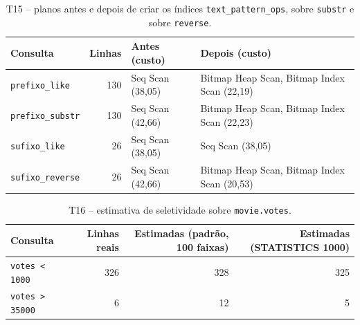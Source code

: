 \documentclass[11pt,a4paper]{article}
\begin{document}
\begin{table}[H]\centering\small
\caption{T15 -- planos antes e depois de criar os índices \texttt{text\_pattern\_ops}, sobre \texttt{substr} e sobre \texttt{reverse}.}\label{tab:t15}
\begin{adjustbox}{max width=\linewidth}\begin{tabular}{lrp{4.2cm}p{4.2cm}}
\toprule
Consulta & Linhas & Antes (custo) & Depois (custo) \\
\midrule
\texttt{prefixo\_like} & 130 & Seq Scan (38,05) & Bitmap Heap Scan, Bitmap Index Scan (22,19) \\
\texttt{prefixo\_substr} & 130 & Seq Scan (42,66) & Bitmap Heap Scan, Bitmap Index Scan (22,23) \\
\texttt{sufixo\_like} & 26 & Seq Scan (38,05) & Seq Scan (38,05) \\
\texttt{sufixo\_reverse} & 26 & Seq Scan (42,66) & Bitmap Heap Scan, Bitmap Index Scan (20,53) \\
\bottomrule
\end{tabular}\end{adjustbox}
\end{table}
\begin{table}[H]\centering\small
\caption{T16 -- estimativa de seletividade sobre \texttt{movie.votes}.}\label{tab:t16}
\begin{adjustbox}{max width=\linewidth}\begin{tabular}{lrrr}
\toprule
Consulta & Linhas reais & Estimadas (padrão, 100 faixas) & Estimadas (STATISTICS 1000) \\
\midrule
\texttt{votes < 1000} & 326 & 328 & 325 \\
\texttt{votes > 35000} & 6 & 12 & 5 \\
\bottomrule
\end{tabular}\end{adjustbox}
\end{table}
\end{document}
